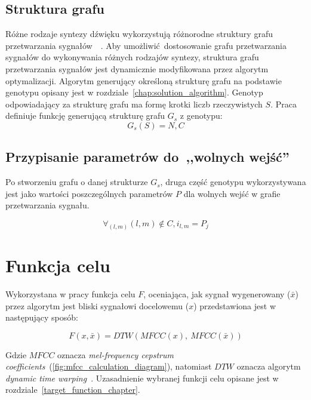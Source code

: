 \subsection{Struktura grafu}\label{sec:graph_structure_definition}

Różne rodzaje syntezy dźwięku wykorzystują różnorodne struktury grafu przetwarzania
sygnałów~\cite{minilogue_diagram}~\cite{digitone_manual}.
Aby umożliwić dostosowanie grafu przetwarzania sygnałów do wykonywania różnych
rodzajów syntezy, struktura grafu przetwarzania sygnałów jest dynamicznie
modyfikowana przez algorytm optymalizacji. Algorytm generujący określoną
strukturę grafu na podstawie genotypu opisany jest w rozdziale~\ref{chap:solution_algorithm}.
Genotyp odpowiadający za strukturę grafu ma formę krotki liczb rzeczywistych $S$.
Praca definiuje funkcję generującą strukturę grafu $G_s$ z genotypu:
\begin{equation}
  G_s(S) = N, C
  \label{eq:graph_structure_generation_function}
\end{equation}

\subsection{Przypisanie parametrów do~,,wolnych wejść''}\label{sec:graph_params_definition}

Po stworzeniu grafu o danej strukturze $G_s$, druga część genotypu wykorzystywana
jest jako wartości poszczególnych parametrów $P$ dla wolnych wejść w grafie przetwarzania
sygnału.

\begin{equation}
  \forall_{(l,m)} (l, m) \notin C, i_{l,m} = P_j
  \label{eq:graph_params_assignment}
\end{equation}

\section{Funkcja celu}

Wykorzystana w pracy funkcja celu $F$, oceniająca, jak sygnał wygenerowany ($\bar{x}$) przez algorytm
jest bliski sygnałowi docelowemu ($x$) przedstawiona jest w następujący sposób:

\begin{equation}
  F(x, \bar{x}) = DTW(MFCC(x),~MFCC(\bar{x}))
  \label{eq:target_function}
\end{equation}

\noindent
Gdzie $MFCC$ oznacza \textit{mel-frequency cepstrum coefficients}~(\ref{fig:mfcc_calculation_diagram}),
natomiast $DTW$ oznacza algorytm \textit{dynamic time warping}~\cite{mfcc_dtw}.
Uzasadnienie wybranej funkcji celu opisane jest w rozdziale~\ref{target_function_chapter}.

